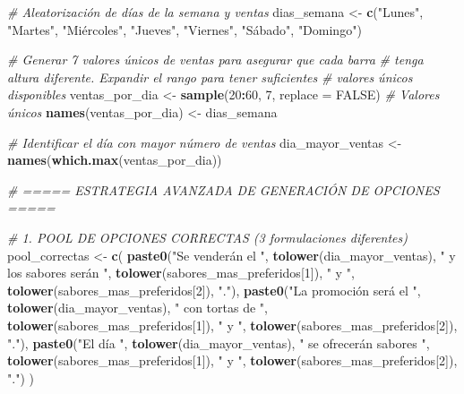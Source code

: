 \documentclass[
]{article}
\newenvironment{Shaded}{\begin{snugshade}}{\end{snugshade}}
\newcommand{\AttributeTok}[1]{\textcolor[rgb]{0.13,0.29,0.53}{#1}}
\newcommand{\CommentTok}[1]{\textcolor[rgb]{0.56,0.35,0.01}{\textit{#1}}}
\newcommand{\ConstantTok}[1]{\textcolor[rgb]{0.56,0.35,0.01}{#1}}
\newcommand{\DecValTok}[1]{\textcolor[rgb]{0.00,0.00,0.81}{#1}}
\newcommand{\FunctionTok}[1]{\textcolor[rgb]{0.13,0.29,0.53}{\textbf{#1}}}
\newcommand{\NormalTok}[1]{#1}
\newcommand{\OtherTok}[1]{\textcolor[rgb]{0.56,0.35,0.01}{#1}}
\newcommand{\SpecialCharTok}[1]{\textcolor[rgb]{0.81,0.36,0.00}{\textbf{#1}}}
\newcommand{\StringTok}[1]{\textcolor[rgb]{0.31,0.60,0.02}{#1}}
\begin{document}
\begin{Shaded}
\begin{Highlighting}[]
  \CommentTok{\# Aleatorización de días de la semana y ventas}
\NormalTok{  dias\_semana }\OtherTok{\textless{}{-}} \FunctionTok{c}\NormalTok{(}\StringTok{"Lunes"}\NormalTok{, }\StringTok{"Martes"}\NormalTok{, }\StringTok{"Miércoles"}\NormalTok{, }\StringTok{"Jueves"}\NormalTok{, }\StringTok{"Viernes"}\NormalTok{, }\StringTok{"Sábado"}\NormalTok{, }\StringTok{"Domingo"}\NormalTok{)}

  \CommentTok{\# Generar 7 valores únicos de ventas para asegurar que cada barra}
  \CommentTok{\# tenga altura diferente. Expandir el rango para tener suficientes}
  \CommentTok{\# valores únicos disponibles}
\NormalTok{  ventas\_por\_dia }\OtherTok{\textless{}{-}} \FunctionTok{sample}\NormalTok{(}\DecValTok{20}\SpecialCharTok{:}\DecValTok{60}\NormalTok{, }\DecValTok{7}\NormalTok{, }\AttributeTok{replace =} \ConstantTok{FALSE}\NormalTok{)  }\CommentTok{\# Valores únicos}
  \FunctionTok{names}\NormalTok{(ventas\_por\_dia) }\OtherTok{\textless{}{-}}\NormalTok{ dias\_semana}
  
  \CommentTok{\# Identificar el día con mayor número de ventas}
\NormalTok{  dia\_mayor\_ventas }\OtherTok{\textless{}{-}} \FunctionTok{names}\NormalTok{(}\FunctionTok{which.max}\NormalTok{(ventas\_por\_dia))}
  
  \CommentTok{\# ===== ESTRATEGIA AVANZADA DE GENERACIÓN DE OPCIONES =====}

  \CommentTok{\# 1. POOL DE OPCIONES CORRECTAS (3 formulaciones diferentes)}
\NormalTok{  pool\_correctas }\OtherTok{\textless{}{-}} \FunctionTok{c}\NormalTok{(}
    \FunctionTok{paste0}\NormalTok{(}\StringTok{"Se venderán el "}\NormalTok{, }\FunctionTok{tolower}\NormalTok{(dia\_mayor\_ventas),}
           \StringTok{" y los sabores serán "}\NormalTok{, }\FunctionTok{tolower}\NormalTok{(sabores\_mas\_preferidos[}\DecValTok{1}\NormalTok{]),}
           \StringTok{" y "}\NormalTok{, }\FunctionTok{tolower}\NormalTok{(sabores\_mas\_preferidos[}\DecValTok{2}\NormalTok{]), }\StringTok{"."}\NormalTok{),}
    \FunctionTok{paste0}\NormalTok{(}\StringTok{"La promoción será el "}\NormalTok{, }\FunctionTok{tolower}\NormalTok{(dia\_mayor\_ventas),}
           \StringTok{" con tortas de "}\NormalTok{, }\FunctionTok{tolower}\NormalTok{(sabores\_mas\_preferidos[}\DecValTok{1}\NormalTok{]),}
           \StringTok{" y "}\NormalTok{, }\FunctionTok{tolower}\NormalTok{(sabores\_mas\_preferidos[}\DecValTok{2}\NormalTok{]), }\StringTok{"."}\NormalTok{),}
    \FunctionTok{paste0}\NormalTok{(}\StringTok{"El día "}\NormalTok{, }\FunctionTok{tolower}\NormalTok{(dia\_mayor\_ventas),}
           \StringTok{" se ofrecerán sabores "}\NormalTok{, }\FunctionTok{tolower}\NormalTok{(sabores\_mas\_preferidos[}\DecValTok{1}\NormalTok{]),}
           \StringTok{" y "}\NormalTok{, }\FunctionTok{tolower}\NormalTok{(sabores\_mas\_preferidos[}\DecValTok{2}\NormalTok{]), }\StringTok{"."}\NormalTok{)}
\NormalTok{  )}


\end{Highlighting}
\end{Shaded}
\end{document}
